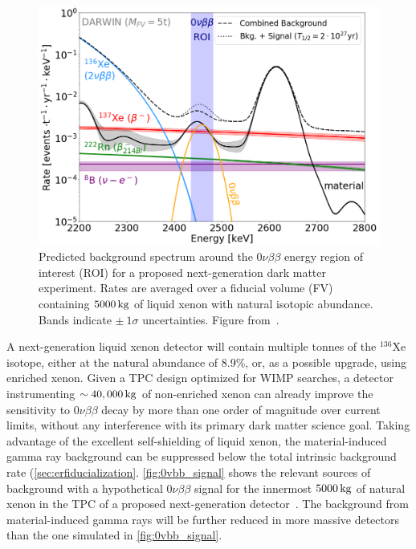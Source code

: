 \begin{figure}[!htbp]
\begin{center}
\includegraphics[width=0.99\columnwidth]{fig_0vbb_signal.png}
\caption{Predicted  background  spectrum around the $0\nu\beta\beta$ energy region of interest (ROI) for a proposed next-generation dark matter experiment. Rates are averaged over a fiducial volume (FV) containing $5000\, \mathrm{kg}$ of liquid xenon with natural isotopic abundance. Bands indicate $\pm~1\sigma$ uncertainties. Figure from~\cite{Agostini:2020adk}.}\label{fig:0vbb_signal}
\end{center}
\end{figure}

A next-generation liquid xenon detector will contain multiple tonnes of the $^{136}$Xe isotope, either at the natural abundance of 8.9\%, or, as a possible upgrade, using enriched xenon. Given a TPC design optimized for WIMP searches, a detector instrumenting $\sim 40,000\, \mathrm{kg}$ of non-enriched xenon can already improve the sensitivity to $0\nu\beta\beta$ decay by more than one order of magnitude over current limits, without any interference with its primary dark matter science goal. Taking advantage of the excellent self-shielding of liquid xenon, the material-induced gamma ray background can be suppressed below the total intrinsic background rate (\autoref{sec:erfiducialization}. \autoref{fig:0vbb_signal} shows the relevant sources of background with a hypothetical $0\nu\beta\beta$ signal for the innermost $5000\, \mathrm{kg}$ of natural xenon in the TPC of a proposed next-generation detector~\cite{Agostini:2020adk}. The background from material-induced gamma rays will be further reduced in more massive detectors than the one simulated in \autoref{fig:0vbb_signal}.

